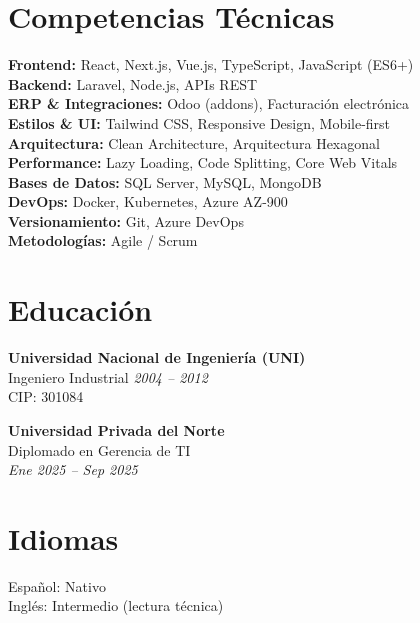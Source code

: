 \documentclass[11pt,a4paper]{article}
\begin{document}
\section*{Competencias Técnicas}

\textbf{Frontend:} React, Next.js, Vue.js, TypeScript, JavaScript (ES6+)\\
\textbf{Backend:} Laravel, Node.js, APIs REST\\
\textbf{ERP & Integraciones:} Odoo (addons), Facturación electrónica\\
\textbf{Estilos & UI:} Tailwind CSS, Responsive Design, Mobile-first\\
\textbf{Arquitectura:} Clean Architecture, Arquitectura Hexagonal\\
\textbf{Performance:} Lazy Loading, Code Splitting, Core Web Vitals\\
\textbf{Bases de Datos:} SQL Server, MySQL, MongoDB\\
\textbf{DevOps:} Docker, Kubernetes, Azure AZ-900\\
\textbf{Versionamiento:} Git, Azure DevOps\\
\textbf{Metodologías:} Agile / Scrum

\section*{Educación}

\textbf{Universidad Nacional de Ingeniería (UNI)}\\
Ingeniero Industrial \hfill \textit{2004 – 2012}\\
CIP: 301084

\vspace{4pt}

\textbf{Universidad Privada del Norte}\\
Diplomado en Gerencia de TI\\
\textit{Ene 2025 – Sep 2025}

\section*{Idiomas}

Español: Nativo\\
Inglés: Intermedio (lectura técnica)
\end{document}
